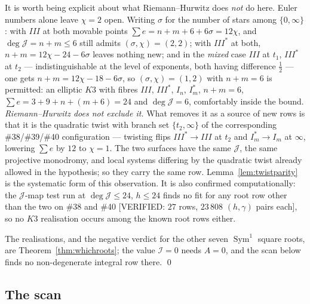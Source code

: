 \documentclass[11pt,reqno]{amsart}
\theoremstyle{plain}
\theoremstyle{definition}
\theoremstyle{remark}
\theoremstyle{plain}
\DeclareMathOperator{\Sym}{Sym}
\newcommand{\VerifiedR}[1]{\textup{\textsf{[VERIFIED: #1]}}}
\begin{document}
It is worth being explicit about what Riemann--Hurwitz does \emph{not} do here.
Euler numbers alone leave $\chi=2$ open. Writing $\sigma$ for the number of stars
among $\{0,\infty\}$: with $III$ at both movable points
$\sum e=n+m+6+6\sigma=12\chi$, and $\deg\mathcal J=n+m\le6$ still admits
$(\sigma,\chi)=(2,2)$; with $III^*$ at both, $n+m=12\chi-24-6\sigma$ leaves
nothing new; and in the \emph{mixed} case $III$ at $t_1$, $III^*$ at $t_2$ ---
indistinguishable at the level of exponents, both having difference $\tfrac12$ ---
one gets $n+m=12\chi-18-6\sigma$, so $(\sigma,\chi)=(1,2)$ with $n+m=6$ is
permitted: an elliptic $K3$ with fibres $III$, $III^*$, $I_n$, $I_m^*$, $n+m=6$,
$\sum e=3+9+n+(m+6)=24$ and $\deg\mathcal J=6$, comfortably inside the bound.
\emph{Riemann--Hurwitz does not exclude it.} What removes it as a source of new
rows is that it is the quadratic twist with branch set $\{t_2,\infty\}$ of the
corresponding \#38/\#39/\#40 configuration --- twisting flips $III^*\!\to\!III$ at
$t_2$ and $I_m^*\!\to\!I_m$ at $\infty$, lowering $\sum e$ by $12$ to $\chi=1$.
The two surfaces have the same $\mathcal J$, the same projective monodromy, and
local systems differing by the quadratic twist already allowed in the hypothesis;
so they carry the same row. Lemma~\ref{lem:twistparity} is the systematic form of
this observation. It is also confirmed computationally: the $\mathcal J$-map test
run at $\deg\mathcal J\le24$, $h\le24$ finds no fit for any root row other than
the two on \#38 and \#40 \VerifiedR{$27$ rows, $23\,808$ $(h,\gamma)$ pairs
each}, so no $K3$ realisation occurs among the known root rows either.

The realisations, and the negative verdict for the other seven $\Sym^1$ square
roots, are Theorem~\ref{thm:whichroots}; the value $\mathcal I=0$ needs $A=0$,
and the scan below finds no non-degenerate integral row there. \qed

\subsection{The scan}
\end{document}
